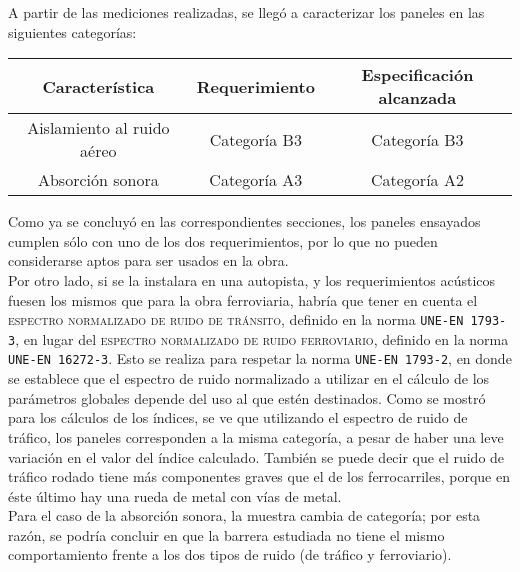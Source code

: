 	A partir de las mediciones realizadas, se llegó a caracterizar los paneles en las siguientes categorías:
	
		\begin{table}[h!]
			\centering
			\begin{tabular}{ccc}
			\toprule
			\textbf{Característica} & \textbf{Requerimiento} & \textbf{Especificación alcanzada}\\
			\midrule
			Aislamiento al ruido aéreo & Categoría B3 & Categoría B3\\
			Absorción sonora & Categoría A3 & Categoría A2\\
			\bottomrule
			\end{tabular}
		\end{table}
		
	Como ya se concluyó en las correspondientes secciones, los paneles ensayados cumplen sólo con uno de los dos requerimientos, por lo que no pueden considerarse aptos para ser usados en la obra.\\
	
	Por otro lado, si se la instalara en una autopista, y los requerimientos acústicos fuesen los mismos que para la obra ferroviaria, habría que tener en cuenta el \textsc{espectro normalizado de ruido de tránsito}, definido en la norma \texttt{UNE-EN 1793-3}, en lugar del \textsc{espectro normalizado de ruido ferroviario}, definido en la norma \texttt{UNE-EN 16272-3}. Esto se realiza para respetar la norma \texttt{UNE-EN 1793-2}, en donde se establece que el espectro de ruido normalizado a utilizar en el cálculo de los parámetros globales depende del uso al que estén destinados. Como se mostró para los cálculos de los índices, se ve que utilizando el espectro de ruido de tráfico, los paneles corresponden a la misma categoría, a pesar de haber una leve variación en el valor del índice calculado. También se puede decir que el ruido de tráfico rodado tiene más componentes graves que el de los ferrocarriles, porque en éste último hay una rueda de metal con vías de metal.\\

	Para el caso de la absorción sonora, la muestra cambia de categoría; por esta razón, se podría concluir en que la barrera estudiada no tiene el mismo comportamiento frente a los dos tipos de ruido (de tráfico y ferroviario).